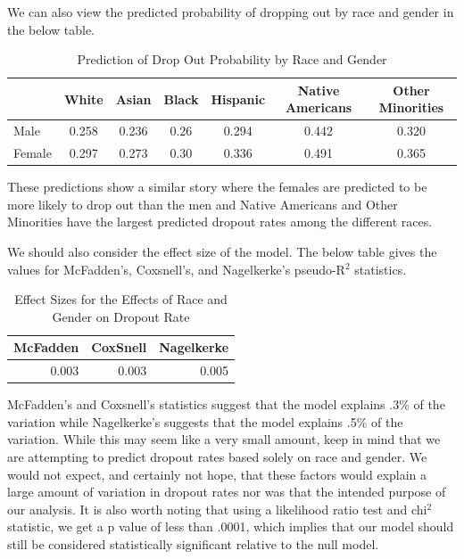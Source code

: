 \documentclass[]{article}
\begin{document}
We can also view the predicted probability of dropping out by race and
gender in the below table.

\begin{table}[H]

\caption{\label{tab:pred}Prediction of Drop Out Probability by Race and Gender}
\centering
\fontsize{12}{14}\selectfont
\begin{tabular}[t]{l|c|c|c|c|c|c}
\hline
  & White & Asian & Black & Hispanic & Native Americans & Other Minorities\\
\hline
Male & 0.258 & 0.236 & 0.26 & 0.294 & 0.442 & 0.320\\
\hline
Female & 0.297 & 0.273 & 0.30 & 0.336 & 0.491 & 0.365\\
\hline
\end{tabular}
\end{table}

These predictions show a similar story where the females are predicted
to be more likely to drop out than the men and Native Americans and
Other Minorities have the largest predicted dropout rates among the
different races.

We should also consider the effect size of the model. The below table
gives the values for McFadden's, Coxsnell's, and Nagelkerke's
pseudo-R\(^2\) statistics.

\begin{table}[H]

\caption{\label{tab:efntable}Effect Sizes for the Effects of Race and Gender on Dropout Rate}
\centering
\fontsize{12}{14}\selectfont
\begin{tabular}[t]{r|r|r}
\hline
McFadden & CoxSnell & Nagelkerke\\
\hline
0.003 & 0.003 & 0.005\\
\hline
\end{tabular}
\end{table}

McFadden's and Coxsnell's statistics suggest that the model explains
.3\% of the variation while Nagelkerke's suggests that the model
explains .5\% of the variation. While this may seem like a very small
amount, keep in mind that we are attempting to predict dropout rates
based solely on race and gender. We would not expect, and certainly not
hope, that these factors would explain a large amount of variation in
dropout rates nor was that the intended purpose of our analysis. It is
also worth noting that using a likelihood ratio test and chi\(^2\)
statistic, we get a p value of less than .0001, which implies that our
model should still be considered statistically significant relative to
the null model.
\end{document}
